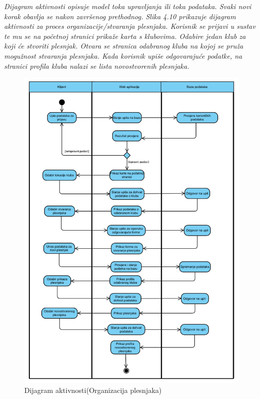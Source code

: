 			\textit{Dijagram aktivnosti opisuje model toka upravljanja ili toka podataka. Svaki novi korak obavlja se nakon završenog prethodnog. Slika 4.10 prikazuje dijagram aktivnosti za proces organizacije/stvaranja  plesnjaka. Korisnik se prijavi u sustav te mu se na početnoj stranici prikaže karta s klubovima. Odabire jedan klub za koji će stvoriti plesnjak. Otvara se stranica odabranog kluba na kojoj se pruža mogužnost stvaranja plesnjaka. Kada korisnik  upiše odgovarajuće podatke, na stranici profila kluba nalazi se lista novostvorenih plesnjaka. }
			
			\begin{figure}[H]
			\centering
			\includegraphics[width=\textwidth]{slike/dijagram_aktivnosti.png}
			\caption{Dijagram aktivnosti(Organizacija plesnjaka)}
			\label{fig:my_label}
	     	\end{figure}
	 	\eject 
			
